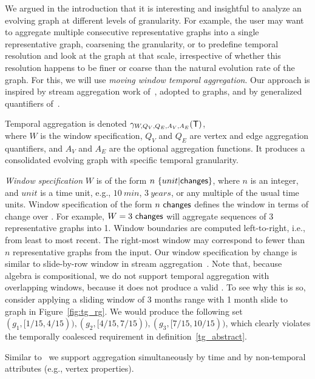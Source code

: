 We argued in the introduction that it is interesting and insightful to
analyze an evolving graph at different levels of granularity.  For
example, the user may want to aggregate multiple consecutive
representative graphs into a single representative graph, coarsening
the granularity, or to predefine temporal resolution and look at the
graph at that scale, irrespective of whether this resolution happens
to be finer or coarse than the natural evolution rate of the graph.
For this, we will use {\em moving window temporal aggregation}.  Our
approach is inspired by stream aggregation work of~\cite{Li2005},
adopted to graphs, and by generalized quantifiers of~\cite{Hsu1995}.

Temporal aggregation is denoted $\gamma_{W,Q_V,Q_E,A_V,A_E} (\mathsf{T})$,\\
where $W$ is the window specification, $Q_V$ and $Q_E$ are vertex and
edge aggregation quantifiers, and $A_V$ and $A_E$ are the optional
aggregation functions.  It produces a consolidated evolving graph with
specific temporal granularity.

{\em Window specification} $W$ is of the form
$n~\{unit|\textsf{changes}\}$, where $n$ is an integer, and $unit$ is a
time unit, e.g., $10~min$, $3~years$, or any multiple of the usual
time units.  Window specification of the form $n~\textsf{changes}$
defines the window in terms of change over \trg.  For example,
$W=3~\textsf{changes}$ will aggregate sequences of 3 representative
graphs into 1.  Window boundaries are computed left-to-right, i.e.,
from least to most recent.  The right-most window may correspond to
fewer than $n$ representative graphs from the input.
%
Our window specification by change is similar to slide-by-row window
in stream aggregation~\cite{Li2005}.  Note that, because \tg algebra
is compositional, we do not support temporal aggregation with
overlapping windows, because it does not produce a valid \tg.  To see
why this is so, consider applying a sliding window of 3 months range
with 1 month slide to graph  in Figure~\ref{fig:tg_rg}.  We
would produce the following set $(g_1, [1/15, 4/15)), (g_2, [4/15,
    7/15)), (g_3, [7/15, 10/15))$, which clearly violates the
      temporally coalesced requirement in
      definition~\ref{tg_abstract}.  

Similar to~\cite{Li2005} we support aggregation simultaneously by time
and by non-temporal attributes (e.g., vertex properties).  

